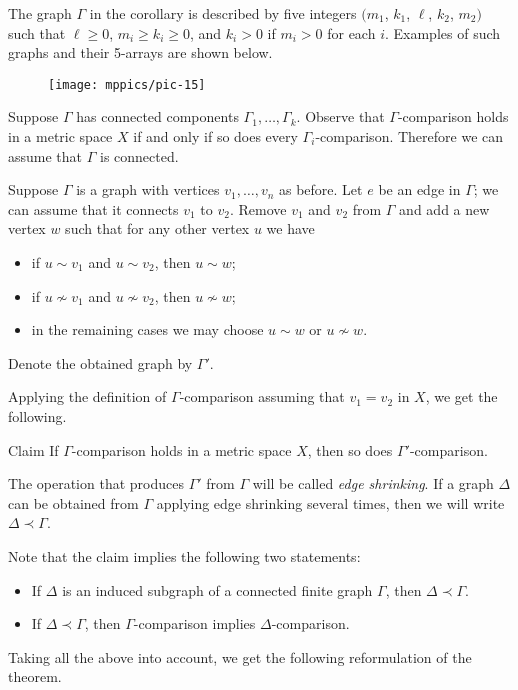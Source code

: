 \documentclass{article}
\begin{document}
The graph $\Gamma$ in the corollary is described by five integers $(m_1$, $k_1$, $\ell$, $k_2$, $m_2)$ such that $\ell \geqslant 0$, $m_i\geqslant k_i\ge 0$, and $k_i>0$ if $m_i>0$ for each $i$.
Examples of such graphs and their 5-arrays are shown below.
\begin{figure}[ht!]
\centering
\texttt{[image: mppics/pic-15]}
\end{figure}

\bigskip

Suppose $\Gamma$ has connected components $\Gamma_1,\dots,\Gamma_k$.
Observe that $\Gamma$-comparison holds in a metric space $X$ if and only if so does every $\Gamma_i$-comparison.
Therefore we can assume that $\Gamma$ is connected.

Suppose $\Gamma$ is a graph with vertices $v_1,\dots,v_n$ as before.
Let $e$ be an edge in $\Gamma$; we can assume that it connects $v_1$ to $v_2$.
Remove $v_1$ and $v_2$ from $\Gamma$ and add a new vertex $w$ such that for any other vertex $u$ we have
\begin{itemize}
 \item if $u\sim v_1$ and $u\sim v_2$, then $u\sim w$;
 \item if $u\nsim v_1$ and $u\nsim v_2$, then $u\nsim w$;
 \item in the remaining cases we may choose $u\sim w$ or $u\nsim w$.
\end{itemize}
Denote the obtained graph by $\Gamma'$.

Applying the definition of $\Gamma$-comparison assuming that $v_1=v_2$ in $X$, we get the following.

\begin{thm}{Claim}
If $\Gamma$-comparison holds in a metric space $X$, then so does $\Gamma'$-comparison.

\end{thm}

The operation that produces $\Gamma'$ from $\Gamma$ will be called \emph{edge shrinking}.
If a graph $\Delta$ can be obtained from $\Gamma$ applying edge shrinking several times, then we will write $\Delta\prec \Gamma$.

Note that the claim implies the following two statements:
\begin{itemize}
 \item If $\Delta$ is an induced subgraph of a connected finite graph $\Gamma$, then $\Delta\prec \Gamma$.
 \item If $\Delta\prec \Gamma$, then $\Gamma$-comparison implies $\Delta$-comparison.
\end{itemize}
Taking all the above into account, we get the following reformulation of the theorem.
\end{document}
